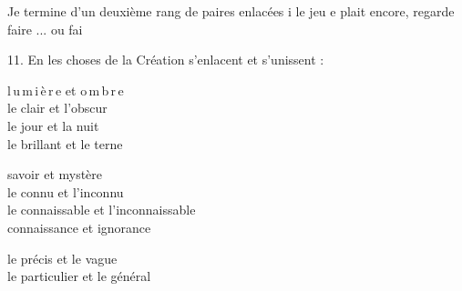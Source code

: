 
Je termine d'un deuxième rang de paires enlacées  i le jeu e plait encore,  regarde faire ... ou  fai  

11. En les choses de la Création s'enlacent et s'unissent :

l\,u\,m\,i\,è\,r\,e \quad et \quad o\,m\,b\,r\,e\\
le clair \quad et l'obscur\\
le jour \quad et la nuit\\
le brillant \quad et le terne

savoir \quad et mystère\\
le connu \quad et l'inconnu\\
le connaissable \quad et l'inconnaissable\\
connaissance \quad et ignorance

le précis \quad et le vague\\
le particulier \quad et le général

